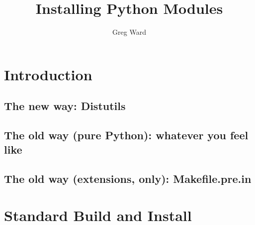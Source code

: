\documentclass{howto}
\title{Installing Python Modules}
\author{Greg Ward}
\begin{document}
\maketitle


\tableofcontents

\section{Introduction}
\label{sec:intro}

\subsection{The new way: Distutils}
\label{sec:new-way}


\subsection{The old way (pure Python): whatever you feel like}
\label{sec:old-way-pure}


\subsection{The old way (extensions, \UNIX{} only): Makefile.pre.in}
\label{sec:old-way-ext}





\section{Standard Build and Install}
\label{sec:normal-install}


\comingsoon



\newcommand{\installscheme}[8]
  {\begin{tableiii}{lll}{textrm}
          {Type of file}
          {Installation Directory}
          {Override option}
     \lineiii{pure module distribution}
             {\filevar{#1}\filenq{#2}}
             {\option{install-purelib}}
     \lineiii{non-pure module distribution}
             {\filevar{#3}\filenq{#4}}
             {\option{install-platlib}}
     \lineiii{scripts}
             {\filevar{#5}\filenq{#6}}
             {\option{install-scripts}}
     \lineiii{data}
             {\filevar{#7}\filenq{#8}}
             {\option{install-data}}
   \end{tableiii}}
\end{document}
